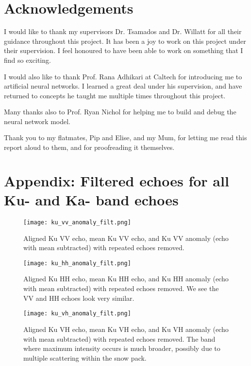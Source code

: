 \documentclass[11pt, a4paper]{article}
\begin{document}
\section*{Acknowledgements}

I would like to thank my supervisors Dr.  Tsamados and Dr.  Willatt for all their guidance throughout this project.  It has been a joy to work on this project under their supervision.  I feel honoured to have been able to work on something that I find so exciting.

I would also like to thank Prof.  Rana Adhikari at Caltech for introducing me to artificial neural networks. I learned a great deal under his supervision,  and have returned to concepts he taught me multiple times throughout this project.

Many thanks also to Prof. Ryan Nichol for helping me to build and debug the neural network model.

Thank you to my flatmates, Pip and Elise, and my Mum,  for letting me read this report aloud to them, and for proofreading it themselves.

\appendix
\section{Appendix: Filtered echoes for all Ku- and Ka- band echoes}
\label{appendix:KuKa}

\begin{figure}[H]
   		 \texttt{[image: ku\_vv\_anomaly\_filt.png]}
    		\caption{Aligned Ku VV echo, mean Ku VV echo,  and Ku VV anomaly (echo with mean subtracted) with repeated echoes removed.}
	\label{fig:kuvvfilt}
\end{figure}

\begin{figure}[H]
   		 \texttt{[image: ku\_hh\_anomaly\_filt.png]}
    		\caption{Aligned Ku HH echo, mean Ku HH echo,  and Ku HH anomaly (echo with mean subtracted) with repeated echoes removed.  We see the VV and HH echoes look very similar.}
	\label{fig:kuhhfilt}
\end{figure}

\begin{figure}[H]
   		 \texttt{[image: ku\_vh\_anomaly\_filt.png]}
    		\caption{Aligned Ku VH echo, mean Ku VH echo,  and Ku VH anomaly (echo with mean subtracted) with repeated echoes removed. The band where maximum intensity occurs is much broader, possibly due to multiple scattering within the snow pack.}
	\label{fig:kuvhfilt}
\end{figure}
\end{document}
